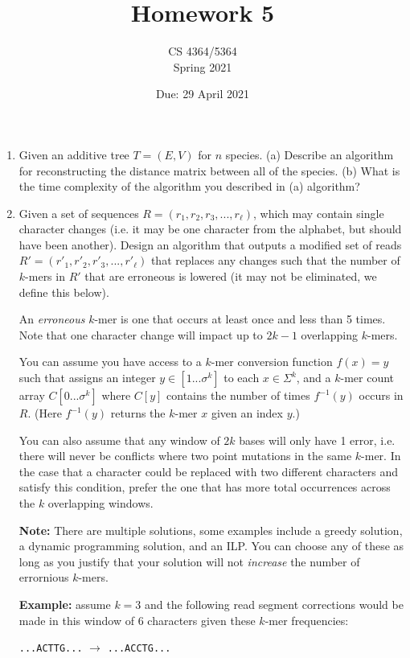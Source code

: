 \documentclass[11pt, oneside]{article}   	%
\title{\vspace{-5em}Homework 5}
\author{CS 4364/5364\\Spring 2021}
\date{Due: 29 April 2021}							%
\begin{document}
\maketitle

\begin{enumerate}

\item 
Given an additive tree $T = (E,V)$ for $n$ species. 
(a) Describe an algorithm for reconstructing the distance matrix between all of the species. 
(b) What is the time complexity of the algorithm you described in (a) algorithm? 

\item Given a set of sequences $R = (r_1,r_2,r_3,...,r_\ell)$, 
which may contain single character changes (i.e. it may be one character from the alphabet, but should have been another).
Design an algorithm that outputs a modified set of reads $R' = (r'_1,r'_2,r'_3,...,r'_\ell)$
that replaces any changes such that the number of $k$-mers in $R'$ that are erroneous is lowered (it may not be eliminated, we define this below). 

An \emph{erroneous} $k$-mer is one that occurs at least once and  less than 5 times. 
Note that one character change will impact up to $2k-1$ overlapping $k$-mers. 

You can assume you have access to 
a $k$-mer conversion function $f(x) = y$ such that assigns an integer $y \in [1...\sigma^k]$ to each $x \in \Sigma^k$, and 
a $k$-mer count array $C[0...\sigma^k]$ where $C[y]$ contains the number of times $f^{-1}(y)$ occurs in $R$. 
(Here $f^{-1}(y)$ returns the $k$-mer $x$ given an index $y$.)

You can also assume that any window of $2k$ bases will only have 1 error, i.e. there will never be conflicts where two point mutations in the same $k$-mer. 
In the case that a character could be replaced with two different characters and satisfy this condition, prefer the one that has more total occurrences across the $k$ overlapping windows. 

\textbf{Note:} There are multiple solutions, some examples include a greedy solution, a dynamic programming solution, and an ILP. 
You can choose any of these as long as you justify that your solution will not \emph{increase} the number of errornious $k$-mers. 
 
\clearpage 
\textbf{Example:} 
assume $k=3$ and the following read segment corrections would be made in this window of $6$ characters given these $k$-mer frequencies:
\begin{center}
\texttt{...ACTTG...} $\longrightarrow$ \texttt{...ACCTG...}


\end{center}
\end{enumerate}
\end{document}
